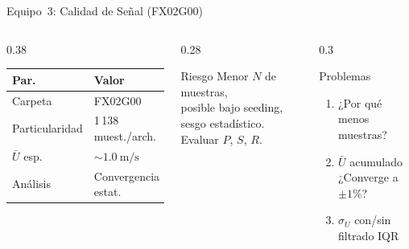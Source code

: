 \documentclass[aspectratio=169,12pt]{beamer}
\begin{document}
\begin{frame}{Equipo~3: Calidad de Señal (FX02G00)}
	\begin{columns}
		\begin{column}{0.38\textwidth}
			\centering\scriptsize
			\begin{tabular}{ll}
				\toprule
				\textbf{Par.}  & \textbf{Valor}           \\
				\midrule
				Carpeta        & FX02G00                  \\
				Particularidad & 1\,138 muest./arch.      \\
				$\bar{U}$ esp. & $\sim\SI{1,0}{\m\per\s}$ \\
				Análisis       & Convergencia estat.      \\
				\bottomrule
			\end{tabular}
		\end{column}
		\begin{column}{0.28\textwidth}
			\begin{alertblock}{\scriptsize Riesgo}
				\scriptsize
				Menor $N$ de muestras,\\
				posible bajo seeding,\\
				sesgo estadístico.\\
				Evaluar $P$, $S$, $R$.
			\end{alertblock}
		\end{column}
		\begin{column}{0.3\textwidth}
			\begin{exampleblock}{\scriptsize Problemas}
				\scriptsize
				\begin{enumerate}
					\item[C.1] ¿Por qué menos\\
					      muestras?
					\item[C.2] $\bar{U}$ acumulado\\
					      ¿Converge a $\pm1\%$?
					\item[C.3] $\sigma_U$ con/sin\\
					      filtrado IQR
				\end{enumerate}
			\end{exampleblock}
		\end{column}
	\end{columns}
\end{frame}
\end{document}
